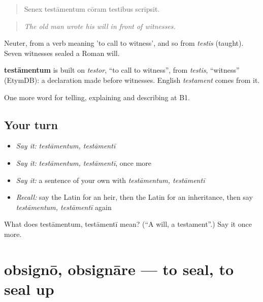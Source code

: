 \begin{quote}
Senex testāmentum cōram testibus scrīpsit.
\end{quote}

\begin{quote}
\emph{The old man wrote his will in front of witnesses.}
\end{quote}

Neuter, from a verb meaning 'to call to witness', and so from \emph{testis} (taught). Seven witnesses sealed a Roman will.

\begin{cousinweb}
\textbf{testāmentum} is built on \emph{testor}, \textquotedblleft{}to call to witness\textquotedblright{}, from \emph{testis}, \textquotedblleft{}witness\textquotedblright{} (EtymDB): a declaration made before witnesses. English \emph{testament} comes from it.
\end{cousinweb}

\begin{grammarlens}[title={What you've built}]
One more word for telling, explaining and describing at B1.
\end{grammarlens}

\subsection*{Your turn}
\begin{itemize}
\raggedright
  \item \emph{Say it:} \emph{testāmentum, testāmentī}
  \item \emph{Say it:} \emph{testāmentum, testāmentī}, once more
  \item \emph{Say it:} a sentence of your own with \emph{testāmentum, testāmentī}
  \item \emph{Recall:} say the Latin for an heir, then the Latin for an inheritance, then say \emph{testāmentum, testāmentī} again
\end{itemize}

\begin{tcolorbox}[breakable,colback=teal!4,colframe=teal!35!black,title={Before you move on}]
What does testāmentum, testāmentī mean? (\textquotedblleft{}A will, a testament\textquotedblright{}.) Say it once more.
\end{tcolorbox}
\section[obsignō, obsignāre]{obsignō, obsignāre — to seal, to seal up}

